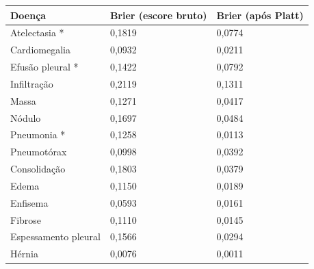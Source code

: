 \begin{tabular}{lll}
\toprule
Doença & Brier (escore bruto) & Brier (após Platt) \\
\midrule
Atelectasia * & 0,1819 & 0,0774 \\
Cardiomegalia & 0,0932 & 0,0211 \\
Efusão pleural * & 0,1422 & 0,0792 \\
Infiltração & 0,2119 & 0,1311 \\
Massa & 0,1271 & 0,0417 \\
Nódulo & 0,1697 & 0,0484 \\
Pneumonia * & 0,1258 & 0,0113 \\
Pneumotórax & 0,0998 & 0,0392 \\
Consolidação & 0,1803 & 0,0379 \\
Edema & 0,1150 & 0,0189 \\
Enfisema & 0,0593 & 0,0161 \\
Fibrose & 0,1110 & 0,0145 \\
Espessamento pleural & 0,1566 & 0,0294 \\
Hérnia & 0,0076 & 0,0011 \\
\bottomrule
\end{tabular}
